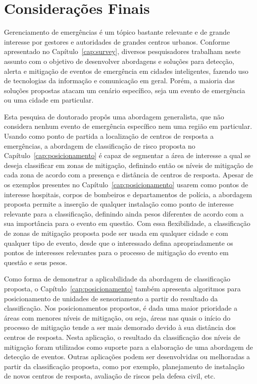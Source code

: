 \chapter{Considerações Finais}\label{cap:conclusao}

Gerenciamento de emergências é um tópico bastante relevante e de grande interesse por gestores e autoridades de grandes centros urbanos. Conforme apresentado no Capítulo~\ref{cap:survey}, diversos pesquisadores trabalham neste assunto com o objetivo de desenvolver abordagens e soluções para detecção, alerta e mitigação de eventos de emergência em cidades inteligentes, fazendo uso de tecnologias da informação e comunicação em geral. Porém, a maioria das soluções propostas atacam um cenário específico, seja um evento de emergência ou uma cidade em particular.

Esta pesquisa de doutorado propôs uma abordagem generalista, que não considera nenhum evento de emergência específico nem uma região em particular. Usando como ponto de partida a localização de centros de resposta a emergências, a abordagem de classificação de risco proposta no Capítulo~\ref{cap:posicionamento} é capaz de segmentar a área de interesse a qual se deseja classificar em zonas de mitigação, definindo então os níveis de mitigação de cada zona de acordo com a presença e distância de centros de resposta. Apesar de os exemplos presentes no Capítulo~\ref{cap:posicionamento} usarem como pontos de interesse hospitais, corpos de bombeiros e departamentos de polícia, a abordagem proposta permite a inserção de qualquer instalação como ponto de interesse relevante para a classificação, definindo ainda pesos diferentes de acordo com a sua importância para o evento em questão. Com essa flexibilidade, a classificação de zonas de mitigação proposta pode ser usada em qualquer cidade e com qualquer tipo de evento, desde que o interessado defina apropriadamente os pontos de interesses relevantes para o processo de mitigação do evento em questão e seus pesos.

Como forma de demonstrar a aplicabilidade da abordagem de classificação proposta, o Capítulo~\ref{cap:posicionamento} também apresenta algoritmos para posicionamento de unidades de sensoriamento a partir do resultado da classificação. Nos posicionamentos propostos, é dada uma maior prioridade a áreas com menores níveis de mitigação, ou seja, áreas nas quais o início do processo de mitigação tende a ser mais demorado devido à sua distância dos centros de resposta. Nesta aplicação, o resultado da classificação dos níveis de mitigação foram utilizados como suporte para a elaboração de uma abordagem de detecção de eventos. Outras aplicações podem ser desenvolvidas ou melhoradas a partir da classificação proposta, como por exemplo, planejamento de instalação de novos centros de resposta, avaliação de riscos pela defesa civil, etc.

